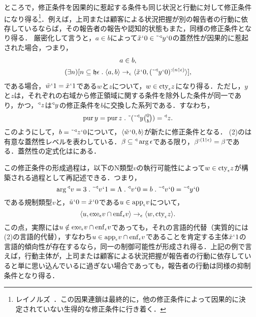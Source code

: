 ところで，修正条件を因果的に惹起する条件も同じ状況と行動に対して修正条件になり得る\footnote{レイノルズ~\cite[p.\,12]{レイノルズ}．この因果連鎖は最終的に，他の修正条件によって因果的に決定されていない生得的な修正条件に行き着く．}．例えば，上司または顧客による状況把握が別の報告者の行動に依存しているならば，その報告者の報告や認知的状態もまた，同様の修正条件となり得る．
厳密化して言うと，$ a\in b $によって$ \tilde{x}{\mspace{1mu}{`}\mspace{1mu}} 0\in\tilde{\:\:}{^\triangleleft}y{\mspace{1mu}{`}\mspace{1mu}} 0 $の蓋然性が因果的に惹起された場合，つまり，
\begin{gather}
    a\in b,\\
    (\exists n)[n\subseteq\indx{\epsilon}\con{1}
        \orp{a,b}\to_{\epsilon}\orp{\tilde{x}\fap0,\prob{(\tildel{\trgl{y}}\fap 0)}{(n\uphl\epsilon)}}
    ],
\end{gather}
である場合，$ \tilde{w}{\mspace{1mu}{`}\mspace{1mu}} 1 = \tilde{x}{\mspace{1mu}{`}\mspace{1mu}} 1 $である$w$と$z$について，$w\in\mathrm{cty}_{\epsilon}z$になり得る．ただし，$y$と$z$は，それぞれの右域から修正領域に関する条件を除外した条件が同一であり，かつ，$ {^\triangleleft}z $は$ {^\triangleleft}y $の修正条件を$b$に交換した系列である．すなわち，
\[
    \mathrm{pur}\,y = \mathrm{pur}\,z\con{1}\tildel{(\tildel{\trgl{y}}\tbinom{0}{b})} = \trgl{z}.
\]
このようにして，$ b = \tilde{\:\:}{^\triangleleft}z{\mspace{1mu}{`}\mspace{1mu}} 0 $について，$ \langle \tilde{w}{\mspace{1mu}{`}\mspace{1mu}} 0,b \rangle $が新たに修正条件となる．
(2)の\kagi{$ \indx{\epsilon} $}は有意な蓋然性レベルを表わしている．$ \beta\subseteq{^\triangleleft}\arg\epsilon $である限り，$ \beta^{:(1\mathbin{\upharpoonleft}\epsilon)}=\beta $である．蓋然性の定式化はにある．

この修正条件の形成過程は，以下のN類型$v$の執行可能性によって$ w\in \mathrm{cty}_{\epsilon}z $が構築される過程として再記述できる．つまり，
\[
    \arg\trgl{v} = 3\con{1}\tildel{\trgl{v}}\fap 1 = \Lambda\con{1}\trgl{v}\fap 0 = b\con{1}
    \tildel{\trgl{v}}\fap 0 = \tildel{\trgl{y}}\fap 0
\]
である規制類型$v$と，$ \tilde{u}{\mspace{1mu}{`}\mspace{1mu}} 0 = \tilde{x}{\mspace{1mu}{`}\mspace{1mu}} 0 $である$ u\in\mathrm{app}_{\epsilon}v $について，
\[
   \langle u,\mathrm{exe}_{\epsilon}v\cap\mathrm{enf}_{\epsilon}v \rangle\to_{\epsilon}\langle w,\mathrm{cty}_{\epsilon}z \rangle.
\]
この点，実際には$ u\notin \mathrm{exe}_{\epsilon}v\cap\mathrm{enf}_{\epsilon}v $であっても，それの言語的代替（実質的には(2)の言語的代替），すなわち$ u\in \mathrm{app}_{\epsilon}v\cap\mathrm{enf}_{\epsilon}v $であることを肯定する主体$ \tilde{x}{\mspace{1mu}{`}\mspace{1mu}} 1 $の言語的傾向性が存在するなら，同一の制御可能性が形成され得る．上記の例で言えば，行動主体が，上司または顧客による状況把握が報告者の行動に依存していると単に思い込んでいるに過ぎない場合であっても，報告者の行動は同様の抑制条件となり得る．

